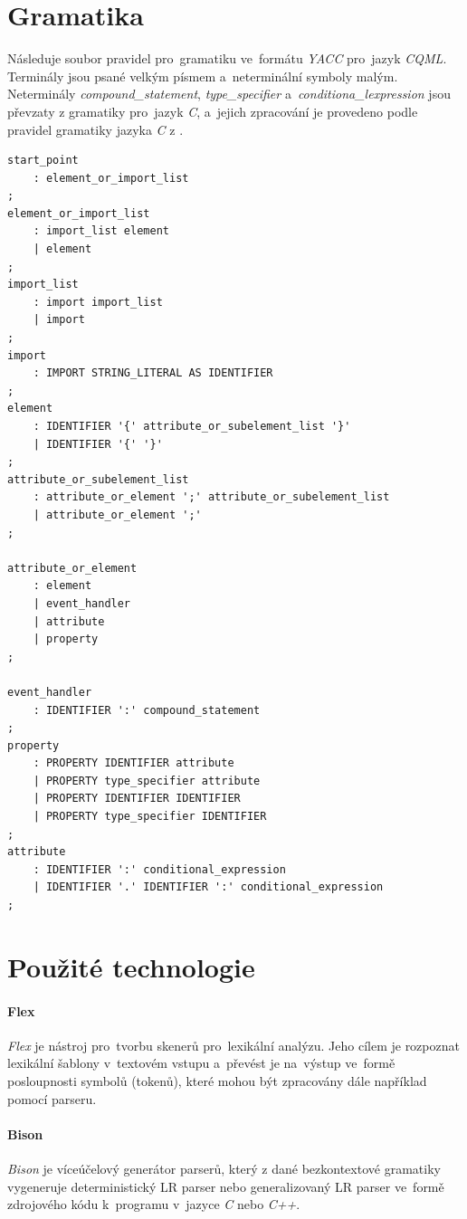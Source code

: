 \documentclass[11pt,twoside,a4paper]{book}
\begin{document}
\chapter{\label{CH:APA}Gramatika}
Následuje soubor pravidel pro~gramatiku ve~formátu \textit{YACC} pro~jazyk \textit{CQML}. Terminály jsou psané velkým písmem a~neterminální symboly malým. Neterminály \textit{compound\_statement}, \textit{type\_specifier} a~\textit{conditiona\_lexpression} jsou převzaty z gramatiky pro~jazyk \textit{C}, a~jejich zpracování je provedeno podle pravidel gramatiky jazyka \textit{C} z \cite{bib:CGrammar}.
\begin{lstlisting}[float,frame=single,caption=Gramatika jazyka \textit{CQML},label=lst:g]
start_point
	: element_or_import_list
;
element_or_import_list
	: import_list element
	| element
;
import_list
	: import import_list
	| import
;
import
	: IMPORT STRING_LITERAL AS IDENTIFIER
;
element
	: IDENTIFIER '{' attribute_or_subelement_list '}'
	| IDENTIFIER '{' '}'
;
attribute_or_subelement_list
	: attribute_or_element ';' attribute_or_subelement_list
	| attribute_or_element ';'
;

attribute_or_element
	: element
	| event_handler
	| attribute
	| property
;

event_handler
	: IDENTIFIER ':' compound_statement
;
property
	: PROPERTY IDENTIFIER attribute
	| PROPERTY type_specifier attribute
	| PROPERTY IDENTIFIER IDENTIFIER
	| PROPERTY type_specifier IDENTIFIER
;
attribute
	: IDENTIFIER ':' conditional_expression
	| IDENTIFIER '.' IDENTIFIER ':' conditional_expression
;
\end{lstlisting}

\clearpage
\chapter{\label{CH:APB}Použité technologie}

\subsubsection{\label{SEC:FLEX}Flex}
\textit{Flex} je nástroj pro~tvorbu skenerů pro~lexikální analýzu. Jeho cílem je rozpoznat lexikální šablony v~textovém vstupu a~převést je na~výstup ve~formě posloupnosti symbolů (tokenů), které mohou být zpracovány dále například pomocí parseru.
\subsubsection{\label{SEC:Bison}Bison}
\textit{Bison} je víceúčelový generátor parserů, který z dané bezkontextové gramatiky vygeneruje deterministický LR parser nebo generalizovaný LR parser ve~formě zdrojového kódu k~programu v~jazyce \textit{C} nebo \textit{C++}.
\end{document}
